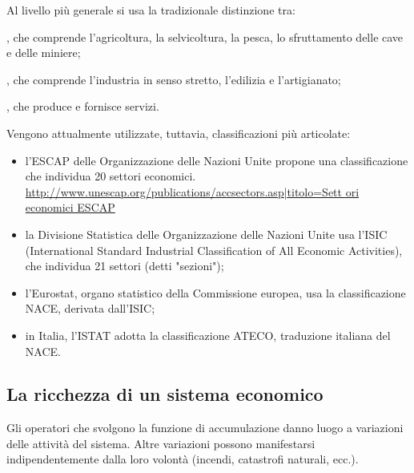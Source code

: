 Al livello più generale si usa la tradizionale distinzione tra:
\begin{description} [noitemsep]
\item [settore primario], che comprende l'agricoltura, la selvicoltura, 
la pesca, lo sfruttamento delle cave e delle miniere;
\item [settore secondario], che comprende l'industria in senso stretto, 
l'edilizia e l'artigianato;
\item [settore terziario], che produce e fornisce servizi.
\end{description}

Vengono attualmente utilizzate, tuttavia, classificazioni più articolate:
\begin{itemize} [noitemsep]
\item l'ESCAP delle Organizzazione delle Nazioni Unite 
propone una classificazione che individua 20 settori 
economici.
\url{http://www.unescap.org/publications/accsectors.asp|titolo=Sett
ori economici ESCAP}
\item la Divisione Statistica delle Organizzazione delle Nazioni 
Unite usa l'ISIC (International Standard Industrial Classification of All 
Economic Activities), che individua 21 settori (detti "sezioni");
\item l'Eurostat, organo statistico della Commissione europea, usa la 
classificazione NACE, derivata dall'ISIC;
\item in Italia, l'ISTAT adotta la classificazione ATECO, traduzione 
italiana del NACE.
\end{itemize}

\subsection{La ricchezza di un sistema economico}


Gli operatori che svolgono la funzione di accumulazione danno luogo a 
variazioni delle attività del sistema. Altre variazioni possono 
manifestarsi indipendentemente dalla loro volontà (incendi, catastrofi 
naturali, ecc.).

